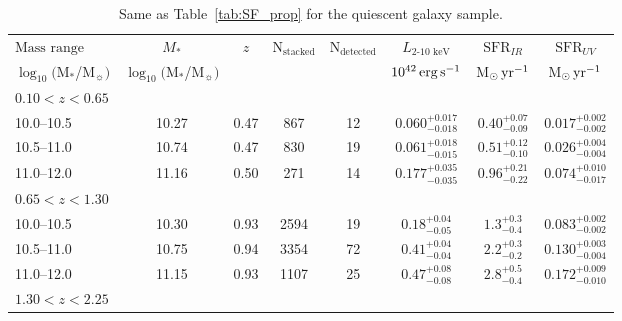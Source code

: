 %
\begin{table*}\centering
\caption{Same as Table~\ref{tab:SF_prop} for the quiescent galaxy sample.}
\vspace{5pt}
\label{tab:Q_prop}
\begin{tabular}{lc|c|c c|c c c}
\hline
\hline
$\text{Mass range}$                             & $M_*$ &  $z$  & N$_{\text{stacked}}$  & N$_{\text{detected}}$ & $L_{\text{2-10~keV}}$   & $\text{SFR}_{IR}$ & $\text{SFR}_{UV}$  \\     %
$\log_{10}($M$_*$/M$_\sun)$     & $\log_{10}($M$_*$/M$_\sun)$   & &     &                       & $10^{42}\,\mathrm{erg}\,\mathrm{s}^{-1}$    & M$_\odot \,\mathrm{yr}^{-1}$        & M$_\odot \,\mathrm{yr}^{-1}$\\ %
\hline
\hline
\multicolumn{8}{l}{$0.10<z<0.65$}       \\
\hline
10.0--10.5          & 10.27    & 0.47   & 867   & 12    & $0.060^{+0.017}_{-0.018}$     & $0.40^{+0.07}_{-0.09}$  & $0.017^{+0.002}_{-0.002}$       \T \B \\ 
10.5--11.0              & 10.74    & 0.47       & 830   & 19    & $0.061^{+0.018}_{-0.015}$     & $0.51^{+0.12}_{-0.10}$  & $0.026^{+0.004}_{-0.004}$       \T \B \\ 
11.0--12.0          & 11.16    & 0.50   & 271   & 14    & $0.177^{+0.035}_{-0.035}$     & $0.96^{+0.21}_{-0.22}$  & $0.074^{+0.010}_{-0.017}$       \T \B \\ 
\hline
\hline
\multicolumn{8}{l}{$0.65<z<1.30$}        \\
\hline
10.0--10.5          & 10.30   & 0.93    & 2594  & 19    & $0.18^{+0.04}_{-0.05}$        & $1.3 ^{+0.3 }_{-0.4 }$  & $0.083^{+0.002}_{-0.002}$     \T \B \\   
10.5--11.0              & 10.75   & 0.94        & 3354  & 72    & $0.41^{+0.04}_{-0.04}$        & $2.2 ^{+0.3 }_{-0.2 }$  & $0.130^{+0.003}_{-0.004}$     \T \B \\   
11.0--12.0          & 11.15   & 0.93    & 1107  & 25    & $0.47^{+0.08}_{-0.08}$        & $2.8 ^{+0.5 }_{-0.4 }$  & $0.172^{+0.009}_{-0.010}$     \T \B \\   
\hline
\hline
\multicolumn{8}{l}{$1.30<z<2.25$}        \\

\end{tabular}
\end{table*}
